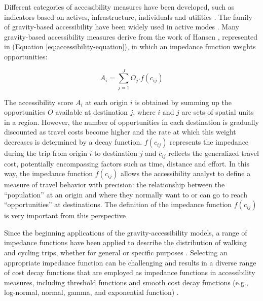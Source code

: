 \documentclass[preprint, 3p,
authoryear]{elsarticle} %
\begin{document}
Different categories of accessibility measures have been developed, such
as indicators based on actives, infrastructure, individuals and
utilities \citep{geurs2004, paez2012}. The family of gravity-based
accessibility have been widely used in active modes \citep{miller2005}.
Many gravity-based accessibility measures derive from the work of Hansen
\citeyearpar{hansen1959}, represented in (Equation
\ref{eq:accessibility-equation}), in which an impedance function weights
opportunities:

\begin{equation}
A_{i} = \sum_{j=1}^J O_j .f(c_{ij})
\label{eq:accessibility-equation}
\end{equation}

The accessibility score \(A_{i}\) at each origin \(i\) is obtained by
summing up the opportunities \(O\) available at destination \(j\), where
\(i\) and \(j\) are sets of spatial units in a region. However, the
number of opportunities in each destination is gradually discounted as
travel costs become higher and the rate at which this weight decreases
is determined by a decay function. \(f(c_{ij})\) represents the
impedance during the trip from origin \(i\) to destination \(j\) and
\(c_{ij}\) reflects the generalized travel cost, potentially
encompassing factors such as time, distance and effort. In this way, the
impedance function \(f(c_{ij})\) allows the accessibility analyst to
define a measure of travel behavior with precision: the relationship
between the ``population'' at an origin and where they normally want to
or can go to reach ``opportunities'' at destinations. The definition of
the impedance function \(f(c_{ij})\) is very important from this
perspective \citep{soukhov2024}.

Since the beginning applications of the gravity-accessibility models, a
range of impedance functions have been applied to describe the
distribution of walking and cycling trips, whether for general or
specific purposes
\citep{iacono2008access, iacono2010, larsen2010, yang2012walking, millward2013active, vale2017influence, li2020approach}.
Selecting an appropriate impedance function can be challenging and
results in a diverse range of cost decay functions that are employed as
impedance functions in accessibility measures, including threshold
functions and smooth cost decay functions (e.g., log-normal, normal,
gamma, and exponential function)
\citep{de2009exponential, reggiani2011accessibility, osth2016new}.
\end{document}
